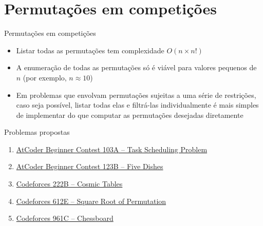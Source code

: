 \section{Permutações em competições}

\begin{frame}[fragile]{Permutações em competições}

    \begin{itemize}
        \item Listar todas as permutações tem complexidade $O(n\times n!)$

        \item A enumeração de todas as permutações só é viável para valores pequenos de $n$ (por exemplo, 
            $n \approx 10$) 

        \item Em problemas que envolvam permutações sujeitas a uma série de restrições, caso seja possível, listar 
            todas elas e filtrá-las individualmente é mais simples de implementar do que computar as permutações 
            desejadas diretamente
    \end{itemize}

\end{frame}

\begin{frame}[fragile]{Problemas propostas}

    \begin{enumerate}
        \item \href{https://atcoder.jp/contests/abc103/tasks/abc103_a}{AtCoder Beginner Contest 103A -- Task Scheduling Problem}

        \item \href{https://atcoder.jp/contests/abc123/tasks/abc123_b}{AtCoder Beginner Contest 123B -- Five Dishes}
        \item \href{https://codeforces.com/problemset/problem/222/B}{Codeforces 222B -- Cosmic Tables}
        \item \href{https://codeforces.com/problemset/problem/612/E}{Codeforces 612E -- Square Root of Permutation}
        \item \href{https://codeforces.com/problemset/problem/961/C}{Codeforces 961C -- Chessboard}
    \end{enumerate}

\end{frame}
